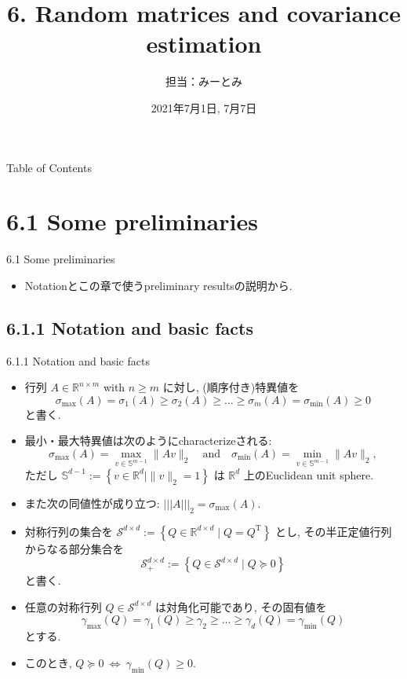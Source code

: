 \documentclass[unicode,aspectratio=169,11pt]{beamer}
\title{6. Random matrices and covariance estimation}
\author{担当：みーとみ}
\date{2021年7月1日, 7月7日}
\newcommand{\bb}{\mathbb}
\newcommand{\cc}{\mathcal}
\newcommand{\tr}{\mathrm{T}}
\begin{document}
\maketitle

\begin{frame}{Table of Contents}{}
    \setcounter{tocdepth}{1}
    \tableofcontents
\end{frame}

\section{6.1 Some preliminaries}
\begin{frame}{6.1 Some preliminaries}
  \begin{itemize}
    \item Notationとこの章で使うpreliminary resultsの説明から.
  \end{itemize}
\end{frame}

\subsection{6.1.1 Notation and basic facts}
\begin{frame}{6.1.1 Notation and basic facts}{}
  \begin{itemize}
    \item 行列 $A \in \bb{R}^{n \times m}$ with $n \ge m$ に対し, (順序付き)特異値を
    \[ \sigma_{\max}(A) = \sigma_1(A) \ge \sigma_2(A) \ge \dots \ge \sigma_m(A) = \sigma_{\min}(A) \ge 0 \]
    と書く.
    \item 最小・最大特異値は次のようにcharacterizeされる:
    \[ \sigma_{\max}(A) = \max_{v \in \bb{S}^{m-1}}\| Av \|_2 \quad \mathrm{and} \quad \sigma_{\min}(A) = \min_{v \in \bb{S}^{m-1}}\|Av\|_2, \tag{6.1} \]
    ただし $\bb{S}^{d-1} := \left\{ v \in \bb{R}^d \mid \|v\|_2 = 1 \right\}$ は $\bb{R}^d$ 上のEuclidean unit sphere.
    \item また次の同値性が成り立つ: $||| A |||_2 = \sigma_{\max}(A)$.
  \end{itemize}
\end{frame}

\begin{frame}
  \begin{itemize}
    \item 対称行列の集合を ${\cc{S}}^{d\times d} := \left\{Q\in\bb{R}^{d\times d} \mid Q = Q^\tr\right\}$ とし, その半正定値行列からなる部分集合を
    \[ \cc{S}_+^{d \times d} := \left\{Q \in \cc{S}^{d \times d} \mid Q \succeq 0\right\} \tag{6.2} \]
    と書く.
    \item 任意の対称行列 $Q \in \cc{S}^{d\times d}$ は対角化可能であり, その固有値を
    \[ \gamma_{\max}(Q) = \gamma_1(Q) \ge \gamma_2 \ge \dots \ge \gamma_d(Q) = \gamma_{\min}(Q) \]
    とする.
    \item このとき, $Q \succeq 0 \ \Leftrightarrow \ \gamma_{\min}(Q) \ge 0$.
  \end{itemize}
\end{frame}
\end{document}
